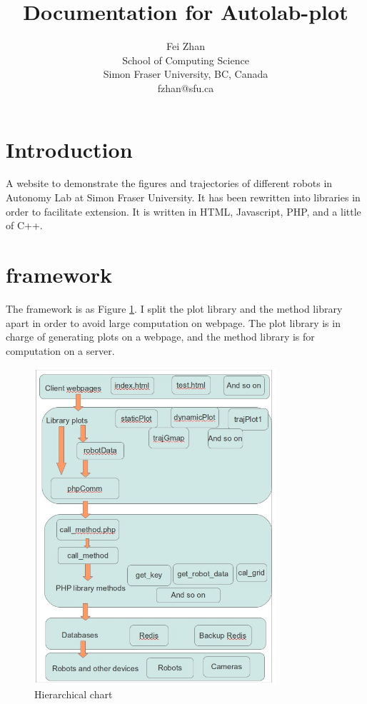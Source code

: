 \documentclass{article}
\begin{document}
\title{Documentation for Autolab-plot}
\author{Fei Zhan \\ School of Computing Science \\ Simon Fraser University, BC, Canada \\ fzhan@sfu.ca}
\maketitle

\section{Introduction}
A website to demonstrate the figures and trajectories of different robots in Autonomy Lab at Simon Fraser University.
It has been rewritten into libraries in order to facilitate extension.
It is written in HTML, Javascript, PHP, and a little of C++.

\section{framework}
The framework is as Figure \ref{hier}.
I split the plot library and the method library apart in order to avoid large computation on webpage.
The plot library is in charge of generating plots on a webpage, and the method library is for computation on a server.

\begin{figure}
\centering
\includegraphics[width=0.8\textwidth]{diagram.jpg}
\caption{Hierarchical chart}
\label{hier}
\end{figure}
\end{document}
